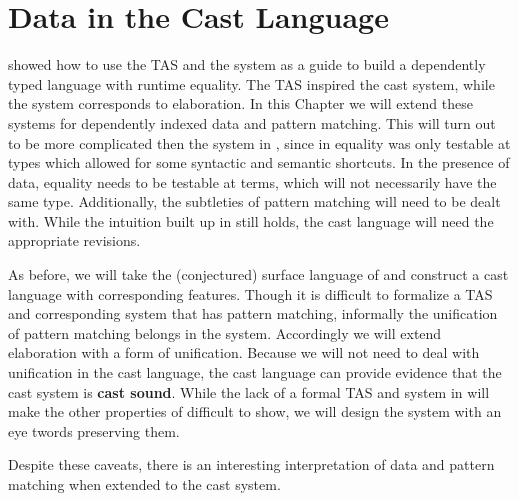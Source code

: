 \chapter{Data in the Cast Language}
\label{chapter:CastData}
\thispagestyle{myheadings}
 
 showed how to use the \ac{TAS} and the \bidir{} system as a guide to build a dependently typed language with runtime equality.
The \ac{TAS} inspired the cast system, while the \bidir{} system corresponds to elaboration.
In this Chapter we will extend these systems for dependently indexed data and pattern matching.
This will turn out to be more complicated then the system in , since in  equality was only testable at types which allowed for some syntactic and semantic shortcuts.
In the presence of data, equality needs to be testable at terms, which will not necessarily have the same type.
Additionally, the subtleties of pattern matching will need to be dealt with.
While the intuition built up in  still holds, the cast language will need the appropriate revisions.
 
As before, we will take the (conjectured) surface language of  and construct a cast language with corresponding features.
Though it is difficult to formalize a \ac{TAS} and corresponding \bidir{} system that has pattern matching, informally the unification of pattern matching belongs in the \bidir{} system.
Accordingly we will extend elaboration with a form of unification.
Because we will not need to deal with unification in the cast language, the cast language can provide evidence that the cast system is \textbf{cast sound}. 
While the lack of a formal \ac{TAS} and \bidir{} system in  will make the other properties of  difficult to show, we will design the system with an eye twords preserving them.
 
 
Despite these caveats, there is an interesting interpretation of data and pattern matching when extended to the cast system.
 
